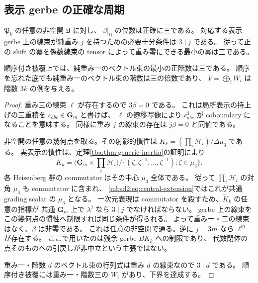 \subsection{表示 gerbe の正確な周期}

\begin{theorem}[全非空開で残る三次障害]
\label{mbsd2:thm:gerbe-period}
$\mathfrak P_k$ の任意の非空開 $\mathfrak U$ に対し、
$\beta|_{\mathfrak U}$ の位数は正確に三である。
対応する表示 gerbe 上の線束が純重み $j$ を持つための必要十分条件は $3\mid j$ である。
従って正の shift の冪を係数線束の tensor によって重み零にできる最小の冪は三である。

順序付き被覆上では、純重み一のベクトル束の最小の正階数は三である。
順序を忘れた底でも純重み一のベクトル束の階数は三の倍数であり、
$V=\bigoplus_iW_i$ は階数 $3k$ の例を与える。
\end{theorem}

\begin{proof}
重み三の線束 $\ell$ が存在するので $3\beta=0$ である。
これは局所表示の持上げの三重積を $c_{abc}\in\mathbf G_m$ と書けば、
$\ell$ の遷移写像により $c_{abc}^3$ が coboundary になることを意味する。
同様に重み $j$ の線束の存在は $j\beta=0$ と同値である。

非空開の任意の幾何点を取る。その射影的慣性は
$K_k=(\prod_i\mathcal H_i)/\Delta\mu_3$ である。
実表示の慣性は、定理\ref{tba:thm:generic-inertia}の証明により
\begin{equation}\label{mbsd2:eq:central-extension}
 \widetilde K_k=
 \bigl(\mathbf G_m\times\prod_i\mathcal H_i\bigr)
 \big/\{(\zeta,\zeta^{-1},\ldots,\zeta^{-1}):\zeta\in\mu_3\}.
\end{equation}
各 Heisenberg 群の commutator はその中心 $\mu_3$ 全体である。
従って $\prod_i\mathcal H_i$ の対角 $\mu_3$ も commutator に含まれ、
\eqref{mbsd2:eq:central-extension}ではこれが共通 grading scalar の $\mu_3$ となる。
一次元表現は commutator を殺すため、$\widetilde K_k$ の任意の指標が
共通 $\mathbf G_m$ 上で $\lambda^j$ なら $3\mid j$ でなければならない。
gerbe 上の線束をこの幾何点の慣性へ制限すれば同じ条件が得られる。
よって重み一・二の線束はなく、$\beta$ は非零である。
これは任意の非空開で通る。逆に $j=3m$ なら $\ell^m$ が存在する。
ここで用いたのは残余 gerbe $BK_k$ への制限であり、
代数閉体の点そのものへの引戻しが非中立という主張ではない。

重み一・階数 $d$ のベクトル束の行列式は重み $d$ の線束なので $3\mid d$ である。
順序付き被覆には重み一・階数三の $W_i$ があり、下界を達成する。
\end{proof}

